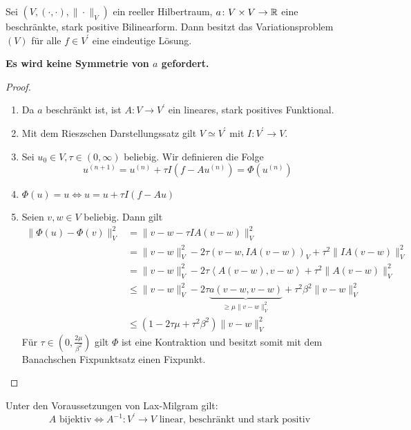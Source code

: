 \begin{lemma}
	Sei $\left(V,\left(\cdot,\cdot\right),\|\cdot\|_{V}\right)$ ein reeller Hilbertraum, $a\colon V\times V\to\mathbb{R}$ eine beschränkte, stark positive Bilinearform.
	Dann besitzt das Variationsproblem $\left(V\right)$ für alle $f\in V^{\prime}$ eine eindeutige Lösung.
	
	\textbf{Es wird keine Symmetrie von $a$ gefordert.}
\end{lemma}
\begin{proof}
	\begin{enumerate}
		\item Da $a$ beschränkt ist, ist $A\colon V\to V^{\prime}$ ein lineares, stark positives Funktional.
		\item Mit dem Rieszschen Darstellungssatz gilt $V\simeq V^{\prime}$ mit $I\colon V^{\prime}\to V$.
		\item Sei $u_{0}\in V, \tau\in\left(0,\infty\right)$ beliebig. Wir definieren die Folge
			\begin{equation*}
				u^{\left(n+1\right)} = u^{\left(n\right)} + \tau I\left(f-Au^{\left(n\right)}\right) = \Phi\left(u^{\left(n\right)}\right)
			\end{equation*}
		\item $\Phi\left(u\right) = u \Leftrightarrow u = u + \tau I\left(f-Au\right)${}
		\item Seien $v,w\in V$ beliebig. Dann gilt
			\begin{align*}
				\|\Phi\left(u\right)-\Phi\left(v\right)\|_{V}^{2} &= \|v-w-\tau IA\left(v-w\right)\|_{V}^{2}\\
					&= \|v-w\|_{V}^{2} - 2\tau\left(v-w,IA\left(v-w\right)\right)_{V} + \tau^{2}\|IA\left(v-w\right)\|_{V}^{2}\\
					&= \|v-w\|_{V}^{2} - 2\tau\left<A\left(v-w\right),v-w\right> + \tau^{2}\|A\left(v-w\right)\|_{V}^{2}\\
					&\leq \|v-w\|_{V}^{2} - 2\tau \underbrace{a\left(v-w,v-w\right)}_{\geq \mu\|v-w\|_{V}^{2}} + \tau^{2}\beta^{2}\|v-w\|_{V}^{2}\\
					&\leq \left(1-2\tau\mu + \tau^{2}\beta^{2}\right)\|v-w\|_{V}^{2}
			\end{align*}
			Für $\tau\in\left(0,\frac{2\mu}{\beta^{2}}\right)$ gilt $\Phi$ ist eine Kontraktion und besitzt somit mit dem Banachschen Fixpunktsatz einen Fixpunkt.
	\end{enumerate}
\end{proof}

\begin{lemma}[Korollar]
	Unter den Voraussetzungen von Lax-Milgram gilt:
	\begin{equation*}
		A\text{ bijektiv}\Leftrightarrow A^{-1}\colon V^{\prime}\to V\text{ linear, beschränkt und stark positiv}
	\end{equation*}
\end{lemma}
